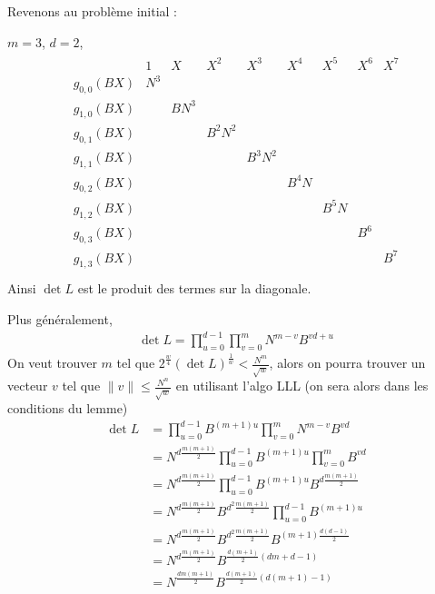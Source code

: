             Revenons au problème initial :
            \begin{expl}
                $m = 3$, $d = 2$,
                \begin{align*}
                    \begin{array}{c||c|c|c|c|c|c|c|c}
                        & 1 & X & X^2 & X^3 & X^4 & X^5 & X^6 & X^7 \\
                        \hline
                        g_{0, 0}(BX) & N^3 & & & & & & & \\
                        g_{1, 0}(BX) & & BN^3 & & & & & & \\
                        g_{0, 1}(BX) & & & B^2N^2 & & & & & \\
                        g_{1, 1}(BX) & & & & B^3N^2 & & & & \\
                        g_{0, 2}(BX) & & & & & B^4N & & & \\
                        g_{1, 2}(BX) & & & & & & B^5N & & \\
                        g_{0, 3}(BX) & & & & & & & B^6 & \\
                        g_{1, 3}(BX) & & & & & & & & B^7 \\
                    \end{array}
                \end{align*}
                Ainsi $\det L$ est le produit des termes sur la diagonale.
            \end{expl}
            Plus généralement,
            \begin{align*}
                \det L = \prod_{u = 0}^{d - 1} \prod_{v = 0}^m N^{m - v} B^{vd + u}
            \end{align*}
            On veut trouver $m$ tel que $2^{\frac w4} (\det L)^{\frac 1w} < \frac{N^m}{\sqrt{w}}$, alors on pourra trouver un vecteur $v$ tel que $\|v\| \leq \frac{N^n}{\sqrt{w}}$ en utilisant l'algo LLL (on sera alors dans les conditions du lemme)
            \begin{align*}
                \det L &= \prod_{u = 0}^{d - 1} B^{(m + 1)u} \prod_{v = 0}^m N^{m - v}B^{vd} \\
                &= N^{d \frac{m(m + 1)}2} \prod_{u = 0}^{d - 1} B^{(m + 1)u} \prod_{v = 0}^m B^{vd} \\
                &= N^{d \frac{m(m + 1)}2} \prod_{u = 0}^{d - 1} B^{(m + 1)u} B^{d \frac{m(m + 1)}2} \\
                &= N^{d \frac{m(m + 1)}2} B^{d^2 \frac{m(m + 1)}2} \prod_{u = 0}^{d - 1} B^{(m + 1)u}  \\
                &= N^{d \frac{m(m + 1)}2} B^{d^2 \frac{m(m + 1)}2} B^{(m + 1) \frac{d(d - 1)}2} \\
                &= N^{d \frac{m(m + 1)}2} B^{\frac{d(m + 1)}2 (dm + d - 1)} \\
                &= N^{\frac{dm(m + 1)}2} B^{\frac{d(m + 1)}2 (d(m + 1) - 1)} \\
            \end{align*}
